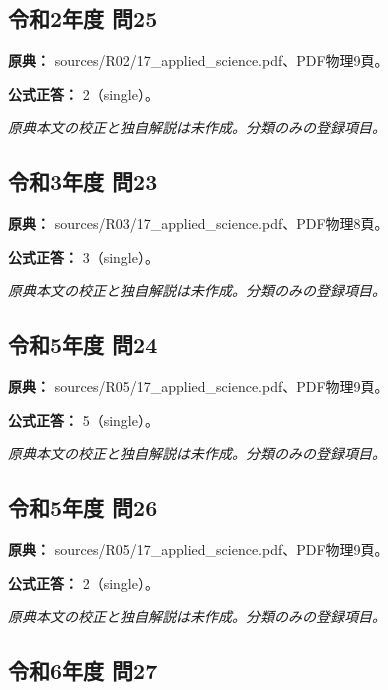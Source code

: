 \subsection{令和2年度 問25}
\label{q:r02-reg-applied-25}

\noindent\textbf{原典：} sources/R02/17\_applied\_science.pdf、PDF物理9頁。

\textbf{公式正答：} 2（single）。

\par\textit{原典本文の校正と独自解説は未作成。分類のみの登録項目。}

\subsection{令和3年度 問23}
\label{q:r03-reg-applied-23}

\noindent\textbf{原典：} sources/R03/17\_applied\_science.pdf、PDF物理8頁。

\textbf{公式正答：} 3（single）。

\par\textit{原典本文の校正と独自解説は未作成。分類のみの登録項目。}

\subsection{令和5年度 問24}
\label{q:r05-reg-applied-24}

\noindent\textbf{原典：} sources/R05/17\_applied\_science.pdf、PDF物理9頁。

\textbf{公式正答：} 5（single）。

\par\textit{原典本文の校正と独自解説は未作成。分類のみの登録項目。}

\subsection{令和5年度 問26}
\label{q:r05-reg-applied-26}

\noindent\textbf{原典：} sources/R05/17\_applied\_science.pdf、PDF物理9頁。

\textbf{公式正答：} 2（single）。

\par\textit{原典本文の校正と独自解説は未作成。分類のみの登録項目。}

\subsection{令和6年度 問27}
\label{q:r06-reg-applied-27}

